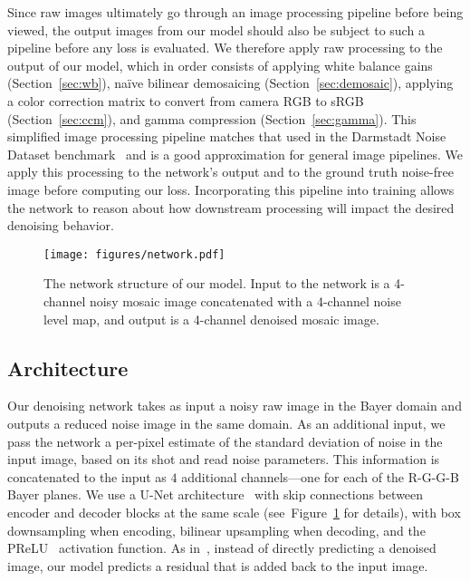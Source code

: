 \documentclass[10pt,twocolumn,letterpaper]{article}
\begin{document}
Since raw images ultimately go through an image processing pipeline before being viewed, the output images from our model should also be subject to such a pipeline before any loss is evaluated. We therefore apply raw processing to the output of our model, which in order consists of applying white balance gains (Section~\ref{sec:wb}), na\"ive bilinear demosaicing (Section~\ref{sec:demosaic}), applying a color correction matrix to convert from camera RGB to sRGB (Section~\ref{sec:ccm}), and gamma compression (Section~\ref{sec:gamma}). This simplified image processing pipeline matches that used in the Darmstadt Noise Dataset benchmark~\cite{plotz2017cvpr} and is a good approximation for general image pipelines. We apply this processing to the network's output and to the ground truth noise-free image before computing our loss. Incorporating this pipeline into training allows the network to reason about how downstream processing will impact the desired denoising behavior.


\begin{figure}[t]
\begin{center}
   \texttt{[image: figures/network.pdf]}
\end{center}
   \caption{The network structure of our model. Input to the network is a 4-channel noisy mosaic image concatenated with a 4-channel noise level map, and output is a 4-channel denoised mosaic image.
}
\label{fig:network}
\end{figure}

\subsection{Architecture}
\label{sec:arch}

Our denoising network takes as input a noisy raw image in the Bayer domain and outputs a reduced noise image in the same domain. As an additional input, we pass the network a per-pixel estimate of the standard deviation of noise in the input image, based on its shot and read noise parameters. This information is concatenated to the input as $4$ additional channels---one for each of the R-G-G-B Bayer planes. We use a U-Net architecture~\cite{unet} with skip connections between encoder and decoder blocks at the same scale (see~Figure~\ref{fig:network} for details), with box downsampling when encoding, bilinear upsampling when decoding, and the PReLU~\cite{he2015delving} activation function. 
As in~\cite{Zhang2017}, instead of directly predicting a denoised image, our model predicts a residual that is added back to the input image.
\end{document}
